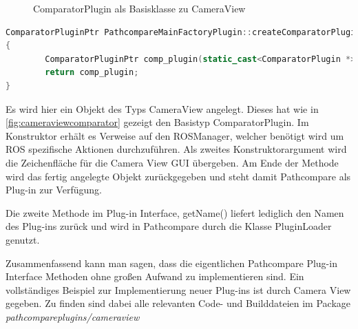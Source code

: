  \begin{figure}[t]
   \begin{center}
   \end{center}
   \caption{ComparatorPlugin als Basisklasse zu CameraView}
   \label{fig:cameraviewcomparator}
 \end{figure}

\begin{lstlisting}[caption=Implementierung der createComparatorPlugin in Camera View, language=C++, basicstyle=\footnotesize, label=lst:create]
ComparatorPluginPtr PathcompareMainFactoryPlugin::createComparatorPlugin(ROSManager * ros_manager, QWidget *tab_widget) const
{
        ComparatorPluginPtr comp_plugin(static_cast<ComparatorPlugin *>(new CameraView(ros_manager, tab_widget)));
        return comp_plugin;
}
\end{lstlisting}

Es wird hier ein Objekt des Typs CameraView angelegt. Dieses
hat wie in \autoref{fig:cameraviewcomparator} gezeigt den Basistyp ComparatorPlugin. Im
Konstruktor erhält es Verweise auf den ROSManager, welcher benötigt wird um ROS
spezifische Aktionen durchzuführen. Als zweites Konstruktorargument wird die
Zeichenfläche für die Camera View GUI übergeben. Am Ende der Methode wird das
fertig angelegte Objekt zurückgegeben und steht damit Pathcompare als Plug-in zur
Verfügung. 

Die zweite Methode im Plug-in Interface, getName() liefert lediglich den Namen
des Plug-ins zurück und wird in Pathcompare durch die Klasse PluginLoader
genutzt.

Zusammenfassend kann man sagen, dass die eigentlichen Pathcompare Plug-in Interface
Methoden ohne großen Aufwand zu implementieren sind. Ein vollständiges
Beispiel zur Implementierung neuer Plug-ins ist durch Camera View gegeben.
Zu finden sind dabei alle relevanten Code- und Builddateien im Package 
\textit{pathcompareplugins/cameraview}

